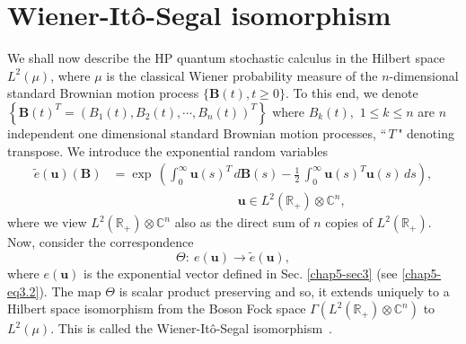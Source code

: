\section{Wiener-It\^{o}-Segal isomorphism}\label{chap5-sec5}

We shall now describe the HP quantum stochastic calculus in the Hilbert space $L^2(\mu)$, where $\mu$ is the classical Wiener  probability measure of the $n$-dimensional standard Brownian motion process $\{\mathbf{B}(t), t\geq 0\}$. To this end, we denote 
$\left\{\mathbf{B}(t)^T=\left(B_1(t), B_2(t),\cdots , B_n(t)\right)^T\right\}$ where $B_k(t),$ $1\leq k\leq n$ are $n$ independent one dimensional standard Brownian motion processes, ``$\,T\,$" denoting transpose. We introduce the exponential random variables 
\begin{align} 
\widetilde{e}(\mathbf{u})(\mathbf{B})& = {\exp}\,\left( \int_0^\infty \mathbf{u}(s)^T\, d\mathbf{B}(s)- 
\frac{1}{2}\,\int_0^\infty \mathbf{u}(s)^T\mathbf{u}(s)\, ds\right),\nonumber \\ 
& \qquad \qquad \qquad \qquad \qquad \mathbf{u}\in L^2(\mathbb{R}_+)\otimes\mathbb{C}^n, \label{chap5-eq5.1}
\end{align}         
where we view $L^2(\mathbb{R}_+)\otimes \mathbb{C}^n$ also as the direct sum of $n$ copies of $L^2(\mathbb{R}_+).$  
Now, consider the correspondence 
$$
\Theta :\ e(\mathbf{u}) \rightarrow \widetilde{e}(\mathbf{u}),
$$
where $e(\mathbf{u})$ is the exponential vector  defined in Sec. \ref{chap5-sec3} (see \eqref{chap5-eq3.2}). The map $\Theta$ is scalar product preserving and so, it extends uniquely to a Hilbert space isomorphism from the Boson Fock space $\Gamma(L^2(\mathbb{R}_+)\otimes\mathbb{C}^n)$ to  $L^2(\mu)$. This is called the Wiener-It\^{o}-Segal isomorphism~\cite{key32,key33,key34}. 

